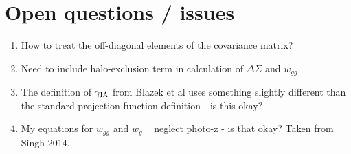 \documentclass[onecolumn,amsmath,aps,fleqn, superscriptaddress]{revtex4}
\begin{document}
\section{Open questions / issues}
\begin{enumerate}
\item{How to treat the off-diagonal elements of the covariance matrix?}
\item{Need to include halo-exclusion term in calculation of $\Delta \Sigma$ and $w_{gg}$.}
\item{The definition of $\gamma_{\rm IA}$ from Blazek et al uses something slightly different than the standard projection function definition - is this okay?}
\item{My equations for $w_{gg}$ and $w_{g+}$ neglect photo-z - is that okay? Taken from Singh 2014.}
\end{enumerate}











\end{document}
